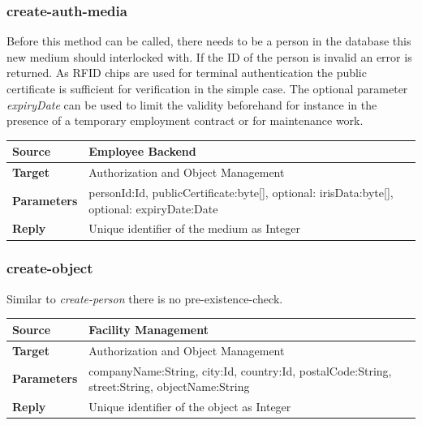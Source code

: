 \documentclass[12pt,a4paper,titlepage,oneside]{scrartcl}
\begin{document}
\subsubsection{create-auth-media}
Before this method can be called, there needs to be a person in the database this new medium should interlocked with. If the ID of the person is invalid an error is returned. As RFID chips are used for terminal authentication the public certificate is sufficient for verification in the simple case. The optional parameter \emph{expiryDate} can be used to limit the validity beforehand for instance in the presence of a temporary employment contract or for maintenance work.

\begin{table}[h]
    \centering
    \begin{tabular}{|l|p{12cm}|} \hline
    \textbf{Source}&Employee Backend\\ \hline
    \textbf{Target}&Authorization and Object Management\\ \hline
    \textbf{Parameters}&personId:Id, publicCertificate:byte[], optional: irisData:byte[], optional: expiryDate:Date\\ \hline
    \textbf{Reply}&Unique identifier of the medium as Integer\\ \hline
    \end{tabular}
\end{table}

\subsubsection{create-object}

Similar to \emph{create-person} there is no pre-existence-check.

\begin{table}[h]

    \centering

    \begin{tabular}{|l|p{12cm}|} \hline

    \textbf{Source}&Facility Management\\ \hline

    \textbf{Target}&Authorization and Object Management\\ \hline

    \textbf{Parameters}&companyName:String, city:Id, country:Id, postalCode:String, street:String, objectName:String\\ \hline

    \textbf{Reply}&Unique identifier of the object as Integer\\ \hline

    \end{tabular}

\end{table}
\end{document}
